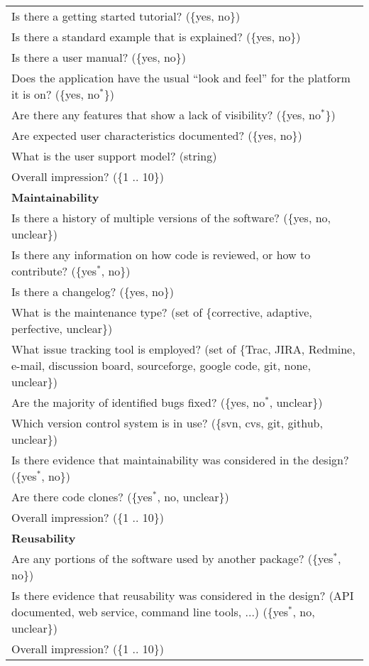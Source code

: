 \begin{longtable}{p{16cm}}
  Is there a getting started tutorial? (\{yes, no\})\\
  Is there a standard example that is explained? (\{yes, no\})\\
  Is there a user manual? (\{yes, no\})\\
  Does the application have the usual ``look and feel'' for the platform it is
  on? (\{yes, no$^*$\})\\
  Are there any features that show a lack of visibility? (\{yes, no$^*$\})\\
  Are expected user characteristics documented? (\{yes, no\})\\
  What is the user support model? (string)\\
  Overall impression? (\{1 .. 10\})\\

  \midrule
  \textbf{Maintainability}\\
  \midrule

  Is there a history of multiple versions of the software?  (\{yes, no, unclear\})\\
  Is there any information on how code is reviewed, or how to contribute?
  (\{yes$^*$, no\})\\
  Is there a changelog?  (\{yes, no\})\\
  What is the maintenance type? (set of \{corrective, adaptive, perfective, unclear\})\\
  What issue tracking tool is employed? (set of \{Trac, JIRA, Redmine, e-mail,
  discussion board, sourceforge, google code, git, none, unclear\})\\
  Are the majority of identified bugs fixed? (\{yes, no$^*$, unclear\})\\
  Which version control system is in use? (\{svn, cvs, git, github, unclear\})\\
  Is there evidence that maintainability was considered in the design?
  (\{yes$^*$, no\})\\
  Are there code clones? (\{yes$^*$, no, unclear\})\\
  Overall impression? (\{1 .. 10\})\\

  \midrule
  \textbf{Reusability}\\
  \midrule

  Are any portions of the software used by another package? (\{yes$^*$, no\})\\
  Is there evidence that reusability was considered in the design? (API
  documented, web service, command line tools, ...) (\{yes$^*$, no, unclear\})\\
  Overall impression? (\{1 .. 10\})\\


\end{longtable}
